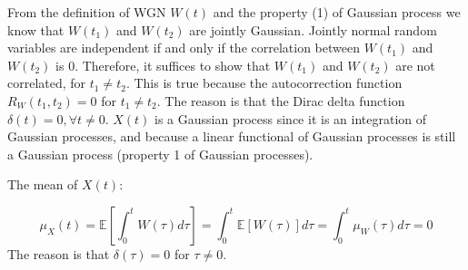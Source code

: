 \documentclass{cisXXX} %
\begin{document}
\maketitle
\HWproblem
From the definition of WGN $W(t)$ and the property (1) of Gaussian process we know that $W \left( t _ { 1 } \right)$ and $W \left( t _ { 2 } \right)$ are jointly Gaussian. Jointly normal random variables are independent if and only if the correlation between $W \left( t _ { 1 } \right)$ and $W \left( t _ { 2 } \right)$ is 0. Therefore, it suffices to show that $W \left( t _ { 1 } \right)$ and $W \left( t _ { 2 } \right)$ are not correlated, for $t _ { 1 } \neq t _ { 2 }$.  
	This is true because the autocorrection function $R _ { W } \left( t _ { 1 } , t _ { 2 } \right) = 0$ for $t _ { 1 } \neq t _ { 2 }$. The reason is that the Dirac delta function $\delta(t) = 0, \forall t \neq 0$.
\HWproblem
$X ( t )$ is a Gaussian process since it is an integration of Gaussian processes, and because a linear functional of Gaussian processes is still a Gaussian process (property 1 of Gaussian processes).

The mean of $X ( t )$:

$$
\mu _ { X } ( t ) = \mathbb { E } \left[ \int _ { 0 } ^ { t } W ( 
\tau ) d \tau \right] = \int _ { 0 } ^ { t } \mathbb { E } [ W ( \tau ) ] d \tau = \int _ { 0 } ^ { t } \mu _ { W } ( \tau ) d \tau = 0
$$
The reason is that $\delta ( \tau ) = 0$ for $\tau \neq 0$.
\end{document}
